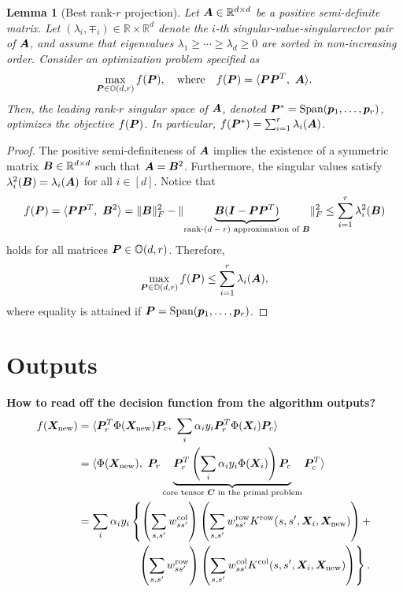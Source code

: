 \documentclass[11pt]{article}
\theoremstyle{plain}
\newtheorem{lem}{Lemma}
\theoremstyle{definition}
\newcommand*{\KeepStyleUnderBrace}[1]{%
  \mathop{%
    \mathchoice
    {\underbrace{\displaystyle#1}}%
    {\underbrace{\textstyle#1}}%
    {\underbrace{\scriptstyle#1}}%
    {\underbrace{\scriptscriptstyle#1}}%
  }\limits
}
\begin{document}
\begin{lem} [Best rank-$r$ projection] \label{lem}
Let $\bm A\in\mathbb{R}^{d\times d}$ be a positive semi-definite matrix. Let $(\lambda_i,\mp_i)\in\mathbb{R}\times \mathbb{R}^d$ denote the $i$-th singular-value-singularvector pair of $\bm A$, and assume that eigenvalues $\lambda_1\geq \cdots \geq \lambda_d\geq 0$ are sorted in non-increasing order. Consider an optimization problem specified as
\[
\max_{\bm{P}\in\mathbb{O}(d,r)}f(\bm{P}),\quad \text{where}\quad f(\bm{P})=\langle \bm{P}\bm{P}^T,\ \bm A\rangle.
\]
Then, the leading rank-$r$ singular space of $\bm A$, denoted $\bm{P}^*=\text{Span}(\bm{p}_1,\ldots,\bm{p}_r)$, optimizes the objective $f(\bm{P})$. In particular, $f(\bm{P}^*)=\sum^r_{i=1}\lambda_i(\bm A)$.
\end{lem}
\begin{proof}
The positive semi-definiteness of $\bm A$ implies the existence of a symmetric matrix $\bm B\in\mathbb{R}^{d\times d}$ such that $\bm A=\bm B^2$. Furthermore, the singular values satisfy $\lambda^2_i(\bm B)=\lambda_i(\bm A)$ for all $i\in[d]$. Notice that
\begin{equation}
f(\mP)=\langle \mP\mP^T,\ \mB^2\rangle = \FnormSize{}{\mB}^2 - \FnormSize{}{\KeepStyleUnderBrace{\mB(\mI-\mP\mP^T)}_{\text{rank-$(d-r)$ approximation of $\mB$}}}^2 \leq \sum^r_{i=1} \lambda_i^2(\mB)
\end{equation}
holds for all matrices $\bm{P}\in\mathbb{O}(d,r)$. Therefore, 
\[
\max_{\bm{P}\in\mathbb{O}(d,r)} f(\bm{P}) \leq \sum_{i=1}^r \lambda_i(\bm A),
\]
where equality is attained if $\bm{P}=\text{Span}(\bm{p}_1,\ldots,\bm{p}_r)$. 
\end{proof}


\section{Outputs}
{\bf How to read off the decision function from the algorithm outputs?} 
\begin{align}\label{eq:function}
f(\mX_{\text{new}}) &=\langle  \mP^T_r\Phi(\mX_{\text{new}})\mP_c, \ \sum_i\alpha_iy_i\mP^T_r\Phi(\mX_i)\mP_c\rangle \notag \\
&=\langle \Phi(\mX_{\text{new}}),\  \mP_r\KeepStyleUnderBrace{\mP^T_r \left(\sum_i \alpha_iy_i\Phi(\mX_i)\right) \mP_c}_{\text{core tensor $\mC$ in the primal problem}}\mP^T_c  \rangle\notag \\
&=\sum_i \alpha_i y_i \left\{ \left(\sum_{s,s'}w^{\text{col}}_{ss'}\right)\left(\sum_{s,s'}w^{\text{row}}_{ss'}K^{\text{row}}(s,s',\mX_i,\mX_{\text{new}})\right)+\right.\notag \\
&\quad\quad\quad\quad\quad\ \left. \left(\sum_{s,s'}w^{\text{row}}_{ss'}\right)\left(\sum_{s,s'}w^{\text{col}}_{ss'}K^{\text{col}}(s,s',\mX_i,\mX_{\text{new}})\right)\right\}.
\end{align}
\end{document}
